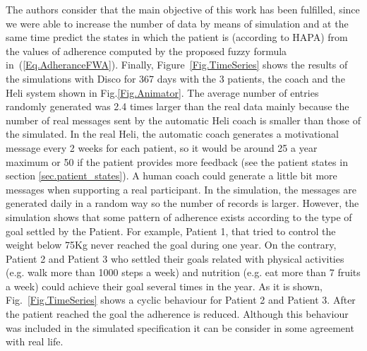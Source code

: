 \documentclass[graybox]{svmult}
\begin{document}
The authors consider that the main objective of this work has been fulfilled, since we were able to increase the number of data by means of simulation and at the same time predict the states in which the patient is (according to HAPA) from the values of adherence computed by the proposed fuzzy formula in~(\ref{Eq.AdheranceFWA}). Finally, Figure~\ref{Fig.TimeSeries} shows the results of the simulations with Disco for 367 days with the 3 patients, the coach and the Heli system shown in Fig.\ref{Fig.Animator}. The average number of entries randomly generated was 2.4 times larger than the real data mainly because the number of real messages sent by the automatic Heli coach is smaller than those of the simulated. In the real Heli, the automatic coach generates a motivational message every 2 weeks for each patient, so it would be around 25 a year maximum or 50 if the patient provides more feedback (see the patient states in section \ref{sec.patient_states}). A human coach could generate a little bit more messages when supporting a real participant. In the simulation, the messages are generated daily in a random way so the number of records is larger. However, the simulation shows that some pattern of adherence exists according to the type of goal settled by the Patient. For example, Patient 1, that tried to control the weight below 75Kg never reached the goal during one year. On the contrary, Patient 2 and Patient 3 who settled their goals related with physical activities (e.g. walk more than 1000 steps a week) and nutrition (e.g. eat more than 7 fruits a week) could achieve their goal several times in the year.  As it is shown, Fig.~\ref{Fig.TimeSeries} shows a cyclic behaviour for Patient 2 and Patient 3. After the patient reached the goal the adherence is reduced. Although this behaviour was included in the simulated specification it can be consider in some agreement with real life. 
\end{document}
